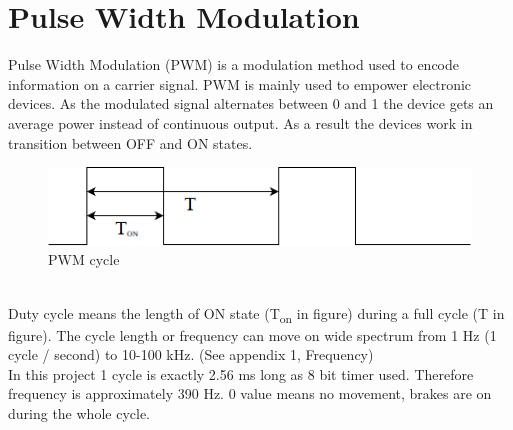 \documentclass[11pt,a4paper,oneside,article]{memoir}
\begin{document}
\section{Pulse Width Modulation}
Pulse Width Modulation (PWM) is a modulation method used to encode information on a carrier signal. PWM is mainly used to empower electronic devices. As the modulated signal alternates between 0 and 1 the device gets an average power instead of continuous output. As a result the devices work in transition between OFF and ON states.\\
\begin{figure}[h]
	\centering
	\includegraphics[width=12cm]{illustration/About_PWM}
	\caption[]{PWM cycle}
	\label{fig:aboutpwm}
\end{figure}\\
Duty cycle means the length of ON state (T\textsubscript{on} in figure) during a full cycle (T in figure). The cycle length or frequency can move on wide spectrum from 1 Hz (1 cycle / second) to 10-100 kHz. (See appendix 1, Frequency)\\
In this project 1 cycle is exactly 2.56 ms long as 8 bit timer used. Therefore frequency is approximately 390 Hz. 0 value means no movement, brakes are on during the whole cycle.
\cite{wikipedia:PWM}
\end{document}
